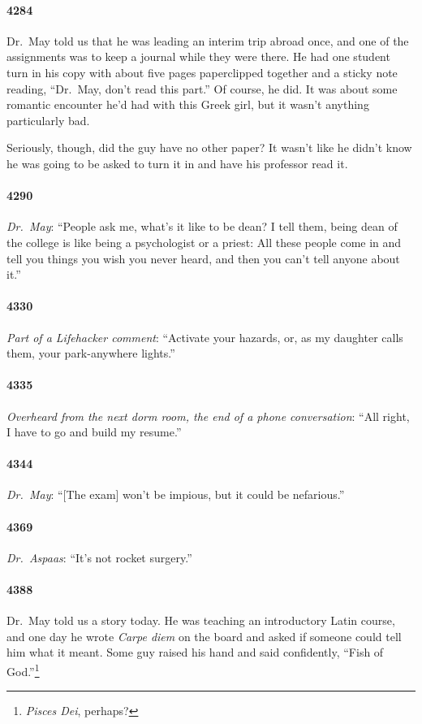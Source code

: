 \documentclass[10pt]{memoir}
\newcommand{\intro}[1]{\emph{#1}}
\begin{document}
\paragraph{4284} Dr.\ May told us that he was leading an interim trip abroad once, and one of the assignments was to keep a journal while they were there. He had one student turn in his copy with about five pages paperclipped together and a sticky note reading, ``Dr.\ May, don't read this part.'' Of course, he did. It was about some romantic encounter he'd had with this Greek girl, but it wasn't anything particularly bad.

Seriously, though, did the guy have no other paper? It wasn't like he didn't know he was going to be asked to turn it in and have his professor read it.

\paragraph{4290} \intro{Dr.\ May}: ``People ask me, what's it like to be dean? I tell them, being dean of the college is like being a psychologist or a priest: All these people come in and tell you things you wish you never heard, and then you can't tell anyone about it.''

\paragraph{4330} \intro{Part of a Lifehacker comment}: ``Activate your hazards, or, as my daughter calls them, your park-anywhere lights.''

\paragraph{4335} \intro{Overheard from the next dorm room, the end of a phone conversation}: ``All right, I have to go and build my resume.''

\paragraph{4344} \intro{Dr.\ May}: ``[The exam] won't be impious, but it could be nefarious.''

\paragraph{4369} \intro{Dr.\ Aspaas}: ``It's not rocket surgery.''

\paragraph{4388} Dr.\ May told us a story today. He was teaching an introductory Latin course, and one day he wrote \emph{Carpe diem} on the board and asked if someone could tell him what it meant. Some guy raised his hand and said confidently, ``Fish of God.''\thinspace\footnote{\emph{Pisces Dei}, perhaps?}
\end{document}
